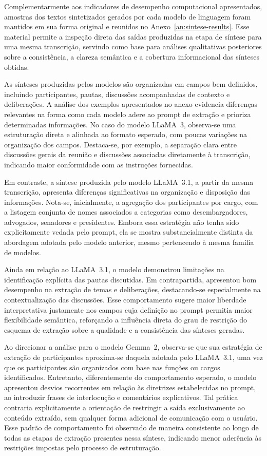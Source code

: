 Complementarmente aos indicadores de desempenho computacional apresentados, amostras dos textos sintetizados gerados por cada modelo de linguagem foram mantidos em sua forma original e reunidos no Anexo~\ref{an:sintese-results}. Esse material permite a inspeção direta das saídas produzidas na etapa de síntese para uma mesma transcrição, servindo como base para análises qualitativas posteriores sobre a consistência, a clareza semântica e a cobertura informacional das sínteses obtidas.

As sínteses produzidas pelos modelos são organizadas em campos bem definidos, incluindo participantes, pautas, discussões acompanhadas de contexto e deliberações. A análise dos exemplos apresentados no anexo evidencia diferenças relevantes na forma como cada modelo adere ao prompt de extração e prioriza determinadas informações. No caso do modelo LLaMA~3, observa-se uma estruturação direta e alinhada ao formato esperado, com poucas variações na organização dos campos. Destaca-se, por exemplo, a separação clara entre discussões gerais da reunião e discussões associadas diretamente à transcrição, indicando maior conformidade com as instruções fornecidas.

Em contraste, a síntese produzida pelo modelo LLaMA~3.1, a partir da mesma transcrição, apresenta diferenças significativas na organização e disposição das informações. Nota-se, inicialmente, a agregação dos participantes por cargo, com a listagem conjunta de nomes associados a categorias como desembargadores, advogados, senadores e presidentes. Embora essa estratégia não tenha sido explicitamente vedada pelo prompt, ela se mostra substancialmente distinta da abordagem adotada pelo modelo anterior, mesmo pertencendo à mesma família de modelos.

Ainda em relação ao LLaMA~3.1, o modelo demonstrou limitações na identificação explícita das pautas discutidas. Em contrapartida, apresentou bom desempenho na extração de temas e deliberações, destacando-se especialmente na contextualização das discussões. Esse comportamento sugere maior liberdade interpretativa justamente nos campos cuja definição no prompt permitia maior flexibilidade semântica, reforçando a influência direta do grau de restrição do esquema de extração sobre a qualidade e a consistência das sínteses geradas.

Ao direcionar a análise para o modelo Gemma~2, observa-se que sua estratégia de extração de participantes aproxima-se daquela adotada pelo LLaMA~3.1, uma vez que os participantes são organizados com base nas funções ou cargos identificados. Entretanto, diferentemente do comportamento esperado, o modelo apresentou desvios recorrentes em relação às diretrizes estabelecidas no prompt, ao introduzir frases de interlocução e comentários explicativos. Tal prática contraria explicitamente a orientação de restringir a saída exclusivamente ao conteúdo extraído, sem qualquer forma adicional de comunicação com o usuário. Esse padrão de comportamento foi observado de maneira consistente ao longo de todas as etapas de extração presentes nessa síntese, indicando menor aderência às restrições impostas pelo processo de estruturação.


